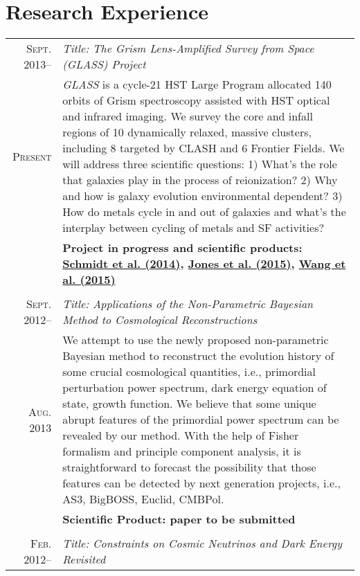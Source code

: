\documentclass[10pt]{article}
\begin{document}
\section{Research Experience}
\vspace{-1ex}
\begin{longtable}{r|p{17cm}}
  \textsc{Sept. 2013}--  &   \emph{Title: The Grism Lens-Amplified Survey from Space (GLASS) Project}   \\
  \textsc{Present}       &   \small{\textit{GLASS} is a cycle-21 HST Large Program allocated 140 orbits of Grism spectroscopy
  assisted with HST optical and infrared imaging. We survey the core and infall regions of 10 dynamically relaxed, massive
  clusters, including 8 targeted by CLASH and 6 Frontier Fields. We will address three scientific questions: 1) What's the role that
  galaxies play in the process of reionization? 2) Why and how is galaxy evolution environmental dependent? 3) How do metals cycle
  in and out of galaxies and what's the interplay between cycling of metals and SF activities?}   \\
  &   \textbf{Project in progress and scientific products: \hyperlink{14.schmidt.apjl}{Schmidt et al. (2014)},
  \hyperlink{15.jones.aj}{Jones et al. (2015)}, \hyperlink{15.wang.apj}{Wang et al. (2015)} } \\
  \multicolumn{2}{c}{} \\
  \textsc{Sept. 2012}--  &   \emph{Title: Applications of the Non-Parametric Bayesian Method to Cosmological Reconstructions}	\\
  \textsc{Aug. 2013}     &   \small{We attempt to use the newly proposed non-parametric Bayesian method to reconstruct the
  evolution history of some crucial cosmological quantities, i.e., primordial perturbation power spectrum, dark energy equation of
  state, growth function. We believe that some unique abrupt features of the primordial power spectrum can be revealed by our
  method. With the help of Fisher formalism and principle component analysis, it is straightforward to forecast the possibility
  that those features can be detected by next generation projects, i.e., AS3, BigBOSS, Euclid, CMBPol.}	\\
  &   \textbf{Scientific Product: paper to be submitted} \\
  \multicolumn{2}{c}{} \\
  \textsc{Feb. 2012}--   &   \emph{Title: Constraints on Cosmic Neutrinos and Dark Energy Revisited}  \\

\end{longtable}
\end{document}
